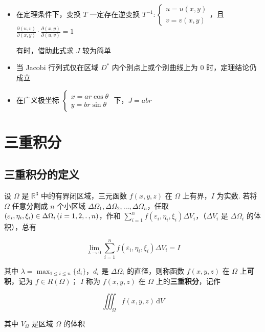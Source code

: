 \documentclass[lang = zh , final , oneside , openany , titlepage , zihao = -4 , linespread = 1.3 , baselineskip = false , cjk-font = windows , text-font = newtx , math-font = newtx]{sjtureport}
\begin{document}
\begin{itemize}
\item
  在定理条件下，变换 \(T\) 一定存在逆变换
  \(T^{-1}:\begin{cases}u=u(x,y)\\v=v(x,y)\end{cases}\)，且
  \(\frac{\partial (u,v)}{\partial (x,y)}\cdot \frac{\partial (x,y)}{\partial (u,v)} = 1\)

  有时，借助此式求 \(J\) 较为简单
\item
  当 Jacobi 行列式仅在区域 \(D^*\) 内个别点上或个别曲线上为 \(0\)
  时，定理结论仍成立
\item
  在广义极坐标
  \(\begin{cases}x=ar\cos\theta\\y=br\sin\theta\end{cases}\)
  下，\(J = abr\)
\end{itemize}

\section{三重积分}

\subsection{三重积分的定义}

\begin{definition}
    设 \(\Omega\) 是 \(\mathbb{R}^3\) 中的有界闭区域，三元函数 \(f(x,y,z)\) 在 \(\Omega\) 上有界，\(I\) 为实数. 若将 \(\Omega\) 任意分割成 \(n\) 个小区域 \(\Delta \Omega_1,\Delta\Omega_2,\ldots,\Delta\Omega_n\)，任取 \(\left(\varepsilon_i,\eta_i,\xi_i \right)\in\Delta\Omega_i\left(i=1,2,\ldotp,n\right)\)，作和 \(\displaystyle\sum_{i=1}^nf\left(\varepsilon_i,\eta_i,\xi_i \right)\Delta V_i\)，（\(\Delta V_i\) 是 \(\Delta\Omega_i\) 的体积），总有

    \[\lim_{\lambda\to 0}\sum_{i=1}^nf\left(\varepsilon_i,\eta_i,\xi_i \right)\Delta V_i = I\]

    其中 \(\lambda = \max_{1\leq i\leq n}\{d_i\}\)，\(d_i\) 是 \(\Delta\Omega_i\) 的直径，则称函数 \(f(x,y,z)\) 在 \(\Omega\) 上\textbf{可积}，记为 \(f\in R(\Omega)\)； \(I\) 称为 \(f(x,y,z)\) 在 \(\Omega\) 上的\textbf{三重积分}，记作

    \[\iiint_\Omega f(x,y,z)\,\mathrm{d}V\]

    其中 \(V_\Omega\) 是区域 \(\Omega\) 的体积
\end{definition}
\end{document}
